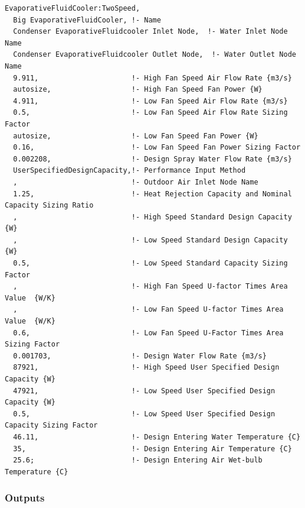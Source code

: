 \begin{lstlisting}
EvaporativeFluidCooler:TwoSpeed,
  Big EvaporativeFluidCooler, !- Name
  Condenser EvaporativeFluidcooler Inlet Node,  !- Water Inlet Node Name
  Condenser EvaporativeFluidcooler Outlet Node,  !- Water Outlet Node Name
  9.911,                      !- High Fan Speed Air Flow Rate {m3/s}
  autosize,                   !- High Fan Speed Fan Power {W}
  4.911,                      !- Low Fan Speed Air Flow Rate {m3/s}
  0.5,                        !- Low Fan Speed Air Flow Rate Sizing Factor
  autosize,                   !- Low Fan Speed Fan Power {W}
  0.16,                       !- Low Fan Speed Fan Power Sizing Factor
  0.002208,                   !- Design Spray Water Flow Rate {m3/s}
  UserSpecifiedDesignCapacity,!- Performance Input Method
  ,                           !- Outdoor Air Inlet Node Name
  1.25,                       !- Heat Rejection Capacity and Nominal Capacity Sizing Ratio
  ,                           !- High Speed Standard Design Capacity {W}
  ,                           !- Low Speed Standard Design Capacity {W}
  0.5,                        !- Low Speed Standard Capacity Sizing Factor
  ,                           !- High Fan Speed U-factor Times Area Value  {W/K}
  ,                           !- Low Fan Speed U-factor Times Area Value  {W/K}
  0.6,                        !- Low Fan Speed U-Factor Times Area Sizing Factor
  0.001703,                   !- Design Water Flow Rate {m3/s}
  87921,                      !- High Speed User Specified Design Capacity {W}
  47921,                      !- Low Speed User Specified Design Capacity {W}
  0.5,                        !- Low Speed User Specified Design Capacity Sizing Factor
  46.11,                      !- Design Entering Water Temperature {C}
  35,                         !- Design Entering Air Temperature {C}
  25.6;                       !- Design Entering Air Wet-bulb Temperature {C}
\end{lstlisting}

\subsubsection{Outputs}\label{outputs-7-001}

